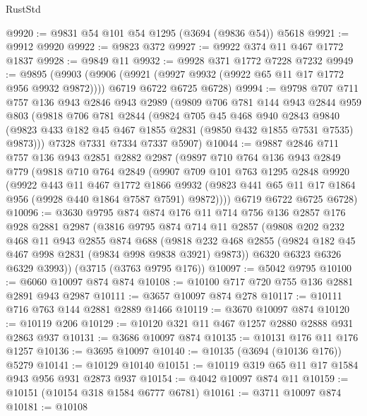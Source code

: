 \begin{lexlean}{RustStd}
\begin{coremodule}
@9920 := @9831 @54 @101 @54 @1295 (@3694 (@9836 @54)) @5618
@9921 := @9912 @9920
@9922 := @9823 @372
@9927 := @9922 @374 @11 @467 @1772 @1837
@9928 := @9849 @11
@9932 := @9928 @371 @1772 @7228 @7232
@9949 := @9895
    (@9903
      (@9906 (@9921 (@9927 @9932 (@9922 @65 @11 @17 @1772 @956 @9932 @9872))))
      @6719
      @6722
      @6725
      @6728)
@9994 := @9798
    @707
    @711
    @757
    @136
    @943
    @2846
    @943
    @2989
    (@9809
      @706
      @781
      @144
      @943
      @2844
      @959
      @803
      (@9818
        @706
        @781
        @2844
        (@9824
          @705
          @45
          @468
          @940
          @2843
          @9840
          (@9823 @433 @182 @45 @467 @1855 @2831 (@9850 @432 @1855 @7531 @7535) @9873)))
      @7328
      @7331
      @7334
      @7337
      @5907)
@10044 := @9887
    @2846
    @711
    @757
    @136
    @943
    @2851
    @2882
    @2987
    (@9897
      @710
      @764
      @136
      @943
      @2849
      @779
      (@9818
        @710
        @764
        @2849
        (@9907
          @709
          @101
          @763
          @1295
          @2848
          @9920
          (@9922
            @443
            @11
            @467
            @1772
            @1866
            @9932
            (@9823 @441 @65 @11 @17 @1864 @956 (@9928 @440 @1864 @7587 @7591) @9872))))
      @6719
      @6722
      @6725
      @6728)
@10096 := @3630
    @9795
    @874
    @874
    @176
    @11
    @714
    @756
    @136
    @2857
    @176
    @928
    @2881
    @2987
    (@3816
      @9795
      @874
      @714
      @11
      @2857
      (@9808
        @202
        @232
        @468
        @11
        @943
        @2855
        @874
        @688
        (@9818 @232 @468 @2855 (@9824 @182 @45 @467 @998 @2831 (@9834 @998 @9838 @3921) @9873))
        @6320
        @6323
        @6326
        @6329
        @3993))
    (@3715 (@3763 @9795 @176))
@10097 := @5042 @9795
@10100 := @6060 @10097 @874 @874
@10108 := @10100 @717 @720 @755 @136 @2881 @2891 @943 @2987
@10111 := @3657 @10097 @874 @278
@10117 := @10111 @716 @763 @144 @2881 @2889 @1466
@10119 := @3670 @10097 @874
@10120 := @10119 @206
@10129 := @10120 @321 @11 @467 @1257 @2880 @2888 @931 @2863 @937
@10131 := @3686 @10097 @874
@10135 := @10131 @176 @11 @176 @1257
@10136 := @3695 @10097
@10140 := @10135 (@3694 (@10136 @176)) @5279
@10141 := @10129 @10140
@10151 := @10119 @319 @65 @11 @17 @1584 @943 @956 @931 @2873 @937
@10154 := @4042 @10097 @874 @11
@10159 := @10151 (@10154 @318 @1584 @6777 @6781)
@10161 := @3711 @10097 @874
@10181 := @10108

\end{coremodule}
\end{lexlean}
